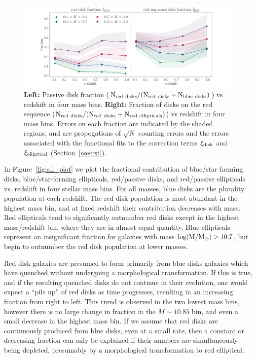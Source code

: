 \documentclass[useAMS,usenatbib]{mn2e}
\begin{document}
\begin{figure}
\centering
\includegraphics[width=\textwidth,trim={0cm 0cm 2cm 1cm},clip]{figures/red_disk_fractions.pdf}
\caption{\textbf{Left:} Passive disk fraction ($\rm N_{red~disks}/(N_{red~disks}+N_{blue~disks})$) vs redshift in four mass bins. \textbf{Right:} Fraction of disks on the red sequence ($\rm N_{red~disks}/(N_{red~disks}+N_{red~ellipticals})$) vs redshift in four mass bins. Errors on each fraction are indicated by the shaded regions, and are propogations of $\sqrt{N}$ counting errors and the errors associated with the functional fits to the correction terms $\xi_{\rm disk}$ and $\xi_{\rm elliptical}$ (Section~\ref{ssec:xi}).} 
\label{fig:f_results}
\end{figure}


In Figure~\ref{fig:all_plot} we plot the fractional contribution of blue/star-forming disks, blue/star-forming ellipticals, red/passive disks, and red/passive ellipticals vs. redshift in four stellar mass bins. For all masses, blue disks are the plurality population at each redshift. The red disk population is most abundant in the highest mass bin, and at fixed redshift their contribution decreases with mass. Red ellipticals tend to significantly outnumber red disks except in the highest mass/redshift bin, where they are in almost equal quantity. Blue ellipticals represent an insignificant fraction for galaxies with mass $\rm log(M/M_{\odot})>10.7$, but begin to outnumber the red disk population at lower masses. 


Red disk galaxies are presumed to form primarily from blue disks galaxies which have quenched without undergoing a morphological transformation. If this is true, and if the resulting quenched disks do not continue in their evolution, one would expect a ``pile up'' of red disks as time progresses, resulting in an increasing fraction from right to left. This trend is observed in the two lowest mass bins, however there is no large change in fraction in the $M\sim10.85$ bin, and even a small decrease in the highest mass bin. If we assume that red disks are continuously produced from blue disks, even at a small rate, then a constant or decreasing fraction can only be explained if their numbers are simultaneously being depleted, presumably by a morphological transformation to red elliptical.
\end{document}
